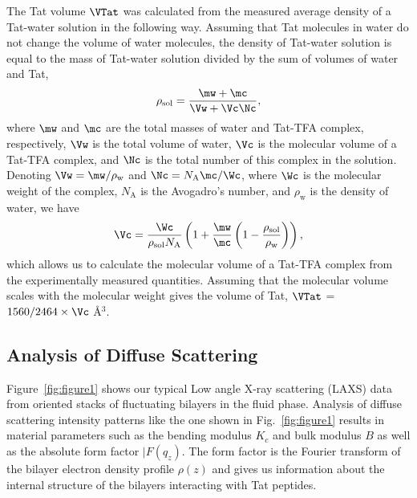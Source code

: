 The Tat volume $\VTat$ was calculated from the measured average density of a 
Tat-water solution in the following way. Assuming that Tat
molecules in water do not change the volume of water molecules, the density
of Tat-water solution is equal to the mass of Tat-water solution divided
by the sum of volumes of water and Tat, 
\begin{equation}
  \rho_\textrm{sol} = \frac{\mw+\mc}{\Vw+\Vc\Nc},
\end{equation}
where $\mw$ and $\mc$
are the total masses of water and Tat-TFA complex, respectively, 
$\Vw$ is the total volume of 
water, $\Vc$ is the molecular volume of a Tat-TFA complex, and $\Nc$ is the total number 
of this complex in the solution. 
Denoting $\Vw=\mw/\rho_\textrm{w}$ 
and $\Nc=N_\textrm{A}\mc/\Wc$, 
where $\Wc$ is the molecular weight of the complex, 
$N_\textrm{A}$ is the Avogadro's number,
and $\rho_\textrm{w}$ is the density of water, we have
\begin{equation}
  \Vc = \frac{\Wc}{\rho_\textrm{sol}N_\textrm{A}} \left( 
        1 + \frac{\mw}{\mc}\left(1-\frac{\rho_\textrm{sol}}{\rho_\textrm{w}}\right) 
        \right),
\end{equation}
which allows us to calculate the molecular volume of a Tat-TFA complex 
from the experimentally measured quantities. 
Assuming that the molecular
volume scales with the molecular weight gives the volume of Tat, 
$\VTat$ = $1560/2464\times\Vc$ \AA$^3$. 

\subsection{Analysis of Diffuse Scattering}\label{sec:diffuse_analysis}
Figure~\ref{fig:figure1} shows our typical Low angle X-ray scattering (LAXS) data 
from oriented stacks of fluctuating bilayers in the fluid phase. Analysis of diffuse scattering 
intensity patterns like the one shown in Fig.~\ref{fig:figure1} results in material 
parameters such as the bending modulus $K_c$ and bulk modulus $B$ as well as
the absolute form factor $|F(q_z)$. 
The form factor is the Fourier transform of the bilayer electron 
density profile $\rho(z)$ and gives us information about the internal structure of the
bilayers interacting with Tat peptides.

